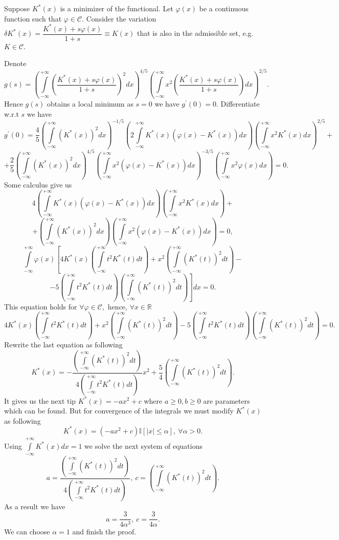 \documentclass[a4paper, 12pt]{article}
\begin{document}
Suppose $K^*(x)$ is a minimizer of the functional. Let $\varphi(x)$ be a continuous function such that $\varphi \in \mathcal{C}.$
Consider the variation $ \delta K^*(x) = \dfrac{K^*(x) + s \varphi(x)}{1 + s} \equiv K(x)$ that is also in the admissible set, e.g. $K \in \mathcal{C}.$

Denote
$$
g(s) = \left( \int \limits_{- \infty}^{+\infty} \left( \dfrac{K^*(x) + s \varphi(x)}{1 + s} \right)^2 dx \right)^{4/5} \left( \int \limits_{- \infty}^{+\infty} x^2 \left( \dfrac{K^*(x) + s \varphi(x)}{1 + s} \right) dx \right)^{2/5}.
$$ 
Hence $g(s)$ obtains a local minimum as $s = 0$ we have $g^{\prime}(0) = 0.$ 
Differentiate w.r.t $s$ we have
$$
g^{\prime}(0) = \dfrac{4}{5} \left( \int \limits_{- \infty}^{+\infty} (K^*(x))^2 dx \right)^{-1/5} 
\left( 2 \int \limits_{- \infty}^{+\infty} K^*(x) (\varphi(x) - K^*(x)) dx \right)
\left( \int \limits_{- \infty}^{+\infty} x^2 K^*(x) dx \right)^{2/5} +
$$
$$ 
+ \dfrac{2}{5} \left( \int \limits_{- \infty}^{+\infty} (K^*(x))^2 dx \right)^{4/5} 
\left( \int \limits_{- \infty}^{+\infty} x^2 (\varphi(x) - K^*(x)) dx \right)^{-3/5}
\left( \int \limits_{- \infty}^{+\infty} x^2 \varphi(x) dx \right) = 0.
$$
Some calculus give us 
$$
4 \left( \int \limits_{- \infty}^{+\infty} K^*(x) (\varphi(x) - K^*(x)) dx \right) 
\left( \int \limits_{- \infty}^{+\infty} x^2 K^*(x) dx \right) +
$$
$$ 
+ \left( \int \limits_{- \infty}^{+\infty}  (K^*(x))^2 dx \right)
\left( \int \limits_{- \infty}^{+\infty} x^2 (\varphi(x) - K^*(x)) dx \right) = 0,
$$
$$
\int \limits_{- \infty}^{+\infty} \varphi(x) \left[4 K^*(x) 
\left( \int \limits_{- \infty}^{+\infty} t^2 K^*(t) dt \right) + 
x^2 \left( \int \limits_{- \infty}^{+\infty}  (K^*(t))^2 dt \right) - \right.
$$
$$
\left. - 5 \left( \int \limits_{- \infty}^{+\infty} t^2 K^*(t) dt \right)
\left( \int \limits_{- \infty}^{+\infty}  (K^*(t))^2 dt \right)
\right] dx = 0.
$$
This equation holds for $\forall \varphi \in \mathcal{C},$ hence, $\forall x \in \mathbb{R}$
$$
4 K^*(x) 
\left( \int \limits_{- \infty}^{+\infty} t^2 K^*(t) dt \right) + 
x^2 \left( \int \limits_{- \infty}^{+\infty}  (K^*(t))^2 dt \right) - 5 \left( \int \limits_{- \infty}^{+\infty} t^2 K^*(t) dt \right)
\left( \int \limits_{- \infty}^{+\infty}  (K^*(t))^2 dt \right) = 0.
$$ 
Rewrite the last equation as following
$$
K^*(x) = - \dfrac{\left( \int \limits_{- \infty}^{+\infty}  (K^*(t))^2 dt \right)}{4\left( \int \limits_{- \infty}^{+\infty} t^2 K^*(t) dt \right)} x^2 + \dfrac{5}{4} \left( \int \limits_{- \infty}^{+\infty}  (K^*(t))^2 dt \right).
$$
It gives us the next tip $K^*(x) = -ax^2 + c$ where $a \geqslant 0, b \geqslant 0$ are parameters which can be found. 
But for convergence of the integrals we must modify $K^*(x)$ as following
$$
K^*(x) = (-ax^2 + c) \mathbb{I}[|x| \leqslant \alpha], ~ \forall \alpha > 0.
$$
Using $\int \limits_{-\infty}^{+\infty} K^*(x)dx = 1$ we solve the next system of equations
$$
a = \dfrac{\left( \int \limits_{- \infty}^{+\infty}  (K^*(t))^2 dt \right)}{4\left( \int \limits_{- \infty}^{+\infty} t^2 K^*(t) dt \right)}, ~ c = \left( \int \limits_{- \infty}^{+\infty}  (K^*(t))^2 dt \right).
$$
As a result we have
$$
a = \dfrac{3}{4 \alpha^3}, ~ c = \dfrac{3}{4\alpha}.
$$
We can choose $\alpha = 1$ and finish the proof.
\end{document}
